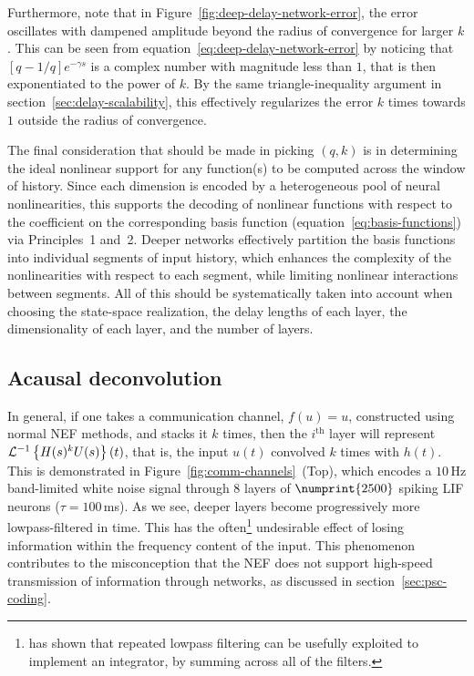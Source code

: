 Furthermore, note that in Figure~\ref{fig:deep-delay-network-error}, the error oscillates with dampened amplitude beyond the radius of convergence for larger $k$.
This can be seen from equation~\ref{eq:deep-delay-network-error} by noticing that $[q-1/q]e^{-\gamma s}$ is a complex number with magnitude less than $1$, that is then exponentiated to the power of $k$.
By the same triangle-inequality argument in section~\ref{sec:delay-scalability}, this effectively regularizes the error $k$ times towards $1$ outside the radius of convergence.

The final consideration that should be made in picking $(q, k)$ is in determining the ideal nonlinear support for any function(s) to be computed across the window of history.
Since each dimension is encoded by a heterogeneous pool of neural nonlinearities, this supports the decoding of nonlinear functions with respect to the coefficient on the corresponding basis function (equation~\ref{eq:basis-functions}) via Principles~1 and~2.
Deeper networks effectively partition the basis functions into individual segments of input history, which enhances the complexity of the nonlinearities with respect to each segment, while limiting nonlinear interactions between segments.
All of this should be systematically taken into account when choosing the state-space realization, the delay lengths of each layer, the dimensionality of each layer, and the number of layers.

\subsection{Acausal deconvolution}
\label{sec:deconvolution}

In general, if one takes a communication channel, $f(u) = u$, constructed using normal NEF methods, and stacks it $k$ times, then the $i^\text{th}$ layer will represent $\mathcal{L}^{-1}\left\{{ H(s)^k U(s) }\right\}(t)$, that is, the input $u(t)$ convolved $k$ times with $h(t)$.
This is demonstrated in Figure~\ref{fig:comm-channels}~(Top), which encodes a $10$\,Hz band-limited white noise signal through $8$ layers of $\numprint{2500}$ spiking LIF neurons ($\tau = 100$\,ms).
As we see, deeper layers become progressively more lowpass-filtered in time.
This has the often\footnote{%
\citet{goldman2009memory} has shown that repeated lowpass filtering can be usefully exploited to implement an integrator, by summing across all of the filters.
}
undesirable effect of losing information within the frequency content of the input.
This phenomenon contributes to the misconception that the NEF does not support high-speed transmission of information through networks, as discussed in section~\ref{sec:psc-coding}.

